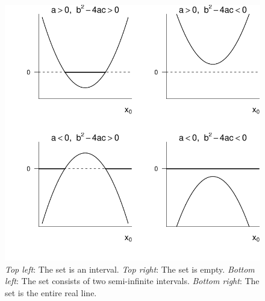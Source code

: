 \documentclass[cmfont,usenames,dvipsnames,leqno]{afit-etd}\usepackage[]{graphicx}\usepackage[]{color}
\makeatletter
\def\maxwidth{ %
  \ifdim\Gin@nat@width>\linewidth
    \linewidth
  \else
    \Gin@nat@width
  \fi
}
\newenvironment{knitrout}{}{} %
\renewenvironment{knitrout}{\begin{singlespace}}{\end{singlespace}}
\makeatother
\begin{document}
\begin{knitrout}
\color{fgcolor}\begin{figure}[H]

\includegraphics[width=\maxwidth]{figure/quadratics} \caption[Quadratics functions]{\textit{Top left}: The set is an interval. \textit{Top right}: The set is empty. \textit{Bottom left}: The set consists of two semi-infinite intervals. \textit{Bottom right}: The set is the entire real line.\label{fig:quadratics}}
\end{figure}


\end{knitrout}
\end{document}

